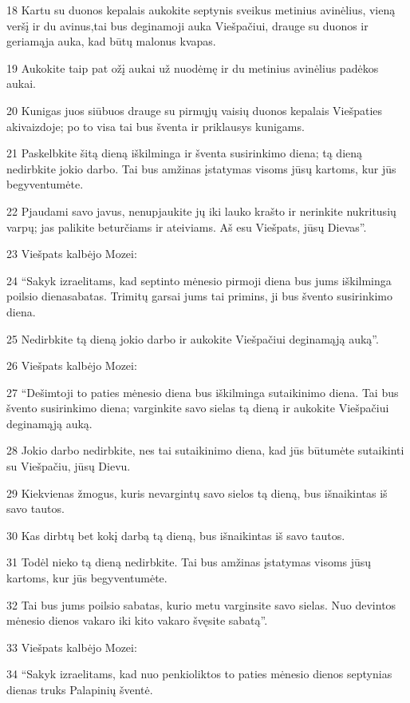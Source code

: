 \par 18 Kartu su duonos kepalais aukokite septynis sveikus metinius avinėlius, vieną veršį ir du avinus,­tai bus deginamoji auka Viešpačiui, drauge su duonos ir geriamąja auka, kad būtų malonus kvapas. 
\par 19 Aukokite taip pat ožį aukai už nuodėmę ir du metinius avinėlius padėkos aukai. 
\par 20 Kunigas juos siūbuos drauge su pirmųjų vaisių duonos kepalais Viešpaties akivaizdoje; po to visa tai bus šventa ir priklausys kunigams. 
\par 21 Paskelbkite šitą dieną iškilminga ir šventa susirinkimo diena; tą dieną nedirbkite jokio darbo. Tai bus amžinas įstatymas visoms jūsų kartoms, kur jūs begyventumėte. 
\par 22 Pjaudami savo javus, nenupjaukite jų iki lauko krašto ir nerinkite nukritusių varpų; jas palikite beturčiams ir ateiviams. Aš esu Viešpats, jūsų Dievas”. 
\par 23 Viešpats kalbėjo Mozei: 
\par 24 “Sakyk izraelitams, kad septinto mėnesio pirmoji diena bus jums iškilminga poilsio diena­sabatas. Trimitų garsai jums tai primins, ji bus švento susirinkimo diena. 
\par 25 Nedirbkite tą dieną jokio darbo ir aukokite Viešpačiui deginamąją auką”. 
\par 26 Viešpats kalbėjo Mozei: 
\par 27 “Dešimtoji to paties mėnesio diena bus iškilminga sutaikinimo diena. Tai bus švento susirinkimo diena; varginkite savo sielas tą dieną ir aukokite Viešpačiui deginamąją auką. 
\par 28 Jokio darbo nedirbkite, nes tai sutaikinimo diena, kad jūs būtumėte sutaikinti su Viešpačiu, jūsų Dievu. 
\par 29 Kiekvienas žmogus, kuris nevargintų savo sielos tą dieną, bus išnaikintas iš savo tautos. 
\par 30 Kas dirbtų bet kokį darbą tą dieną, bus išnaikintas iš savo tautos. 
\par 31 Todėl nieko tą dieną nedirbkite. Tai bus amžinas įstatymas visoms jūsų kartoms, kur jūs begyventumėte. 
\par 32 Tai bus jums poilsio sabatas, kurio metu varginsite savo sielas. Nuo devintos mėnesio dienos vakaro iki kito vakaro švęsite sabatą”. 
\par 33 Viešpats kalbėjo Mozei: 
\par 34 “Sakyk izraelitams, kad nuo penkioliktos to paties mėnesio dienos septynias dienas truks Palapinių šventė. 
